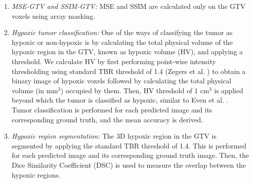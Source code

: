 \begin{enumerate}
    
    \item \textit{MSE-GTV and SSIM-GTV:} MSE and SSIM are calculated only on the GTV voxels using array masking.
    
    \item \textit{Hypoxic tumor classification:} One of the ways of classifying the tumor as hypoxic or non-hypoxic is by calculating the total physical volume of the hypoxic region in the GTV, known as hypoxic volume (HV), and applying a threshold. We calculate HV by first performing point-wise intensity thresholding using standard TBR threshold of 1.4 (Zegers et al. \cite{zegers2013hypoxia}) to obtain a binary image of hypoxic voxels followed by calculating the total physical volume (in mm$^3$) occupied by them. Then, HV threshold of 1 cm$^3$ is applied beyond which the tumor is classified as hypoxic, similar to Even et al. \cite{even2017predicting}. Tumor classification is performed for each predicted image and its corresponding ground truth, and the mean accuracy is derived.
    
    \item \textit{Hypoxic region segmentation:} The 3D hypoxic region in the GTV is segmented by applying the standard TBR threshold of 1.4. This is performed for each predicted image and its corresponding ground truth image. Then, the Dice Similarity Coefficient (DSC) is used to measure the overlap between the hypoxic regions. 

\end{enumerate}


